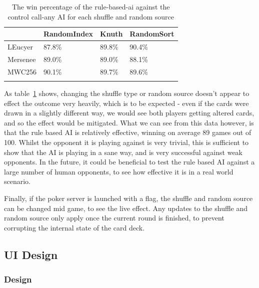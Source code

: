 \begin{table}[H]
    \begin{adjustbox}{center}
    \begin{tabular}{l l l l}
    \toprule
                & RandomIndex   & Knuth & RandomSort  \\
    \midrule
    LEucyer     & 87.8\%        & 89.8\%& 90.4\%      \\ \addlinespace
    Mersenee    & 89.0\%        & 89.0\%& 88.1\%      \\ \addlinespace
    MWC256      & 90.1\%        & 89.7\%& 89.6\%      \\ \addlinespace
    \bottomrule
    \end{tabular}
    \end{adjustbox}
    \caption{The win percentage of the rule-based-ai against the control
             call-any AI for each shuffle and random source}
    \label{table:winpercentage}
\end{table}

As table~\ref{table:winpercentage} shows, changing the shuffle type or random
source doesn't appear to
effect the outcome very heavily, which is to be expected - even if the cards
were drawn in a slightly different way, we would see both players getting
altered cards, and so the effect would be mitigated. What we can see from this
data however, is that the rule based AI is relatively effective, winning on
average 89 games out of 100. Whilst the opponent it is playing against is very
trivial, this is sufficient to show that the AI is playing in a sane way, and
is very successful against weak opponents. In the future, it could be beneficial
to test the rule based AI against a large number of human opponents, to see
how effective it is in a real world scenario.

Finally, if the poker server is launched with a flag, the shuffle and random
source can be changed mid game, to see the live effect. Any updates to the
shuffle and random source only apply once the current round is finished, to
prevent corrupting the internal state of the card deck.

\subsection{UI Design}\label{section:ui}

\subsubsection{Design}\label{section:uidesign}

